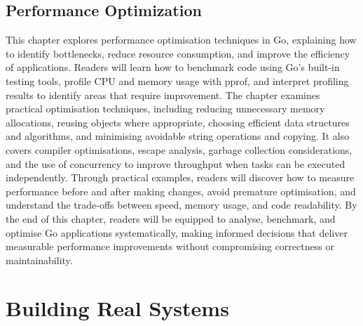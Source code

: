 \documentclass[12pt,oneside]{book}
\begin{document}
\chapter{Performance Optimization}
\begin{chaptersummary}
This chapter explores performance optimisation techniques in Go, explaining how to identify bottlenecks, reduce resource consumption, and improve the efficiency of applications. Readers will learn how to benchmark code using Go’s built-in testing tools, profile CPU and memory usage with pprof, and interpret profiling results to identify areas that require improvement. The chapter examines practical optimisation techniques, including reducing unnecessary memory allocations, reusing objects where appropriate, choosing efficient data structures and algorithms, and minimising avoidable string operations and copying. It also covers compiler optimisations, escape analysis, garbage collection considerations, and the use of concurrency to improve throughput when tasks can be executed independently. Through practical examples, readers will discover how to measure performance before and after making changes, avoid premature optimisation, and understand the trade-offs between speed, memory usage, and code readability. By the end of this chapter, readers will be equipped to analyse, benchmark, and optimise Go applications systematically, making informed decisions that deliver measurable performance improvements without compromising correctness or maintainability.
\end{chaptersummary}


\part{Building Real Systems}
\end{document}

